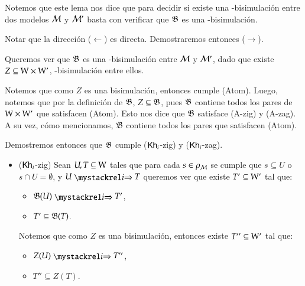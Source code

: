 Notemos que este lema nos dice que para decidir si existe una \KHilogic-bisimulación
entre dos modelos $\mathcal{M}$ y $\mathcal{M}'$ basta con verificar que $\mathfrak{B}$ es una \KHilogic-bisimulación.

\begin{demostracion}

    Notar que la dirección ($\leftarrow$) es directa. Demostraremos entonces ($\rightarrow$).

    Queremos ver que $\mathfrak{B}$ es una \KHilogic-bisimulación entre $\mathcal{M}$ y $\mathcal{M}'$,
    dado que existe $Z \subseteq \mathrm{W} \times \mathrm{W}'$, \KHilogic-bisimulación entre ellos.

    Notemos que como $Z$ es una bisimulación, entonces cumple (Atom). Luego, notemos que
    por la definición de $\mathfrak{B}$, $Z \subseteq \mathfrak{B}$, pues $\mathfrak{B}$ contiene todos los pares de
    $\mathrm{W} \times \mathrm{W}'$ que satisfacen (Atom). Esto nos dice que $\mathfrak{B}$ satisface (A-zig) y (A-zag).
    A su vez, cómo mencionamos, $\mathfrak{B}$ contiene todos los pares que satisfacen (Atom).

    Demostremos entonces que $\mathfrak{B}$ cumple ($\mathsf{Kh}_i$-zig) y ($\mathsf{Kh}_i$-zag).

    \begin{itemize}
        \item ($\mathsf{Kh}_i$-zig) Sean $U,T \subseteq \mathrm{W}$ tales que para cada $s \in \rho_{\mathcal{M}}$ se cumple que $s \subseteq U$ 
        o $s \cap U = \emptyset$, y $U \ultsExecAgi T$ queremos ver que existe $T' \subseteq \mathrm{W}'$ tal que:
    
        \begin{multicols}{2}
            \begin{itemize}
                \item $\universalbis(U) \ultsExecAgi T'$, 
                \item $T' \subseteq \mathfrak{B}(T)$.
            \end{itemize}
        \end{multicols}
    
        Notemos que como $Z$ es una bisimulación, entonces existe $T'' \subseteq \mathrm{W}'$ tal que:
    
        \begin{multicols}{2}
            \begin{itemize}
                \item $Z(U) \ultsExecAgi T''$, 
                \item $T'' \subseteq Z(T)$.
            \end{itemize}
        \end{multicols}
    

\end{itemize}
\end{demostracion}
